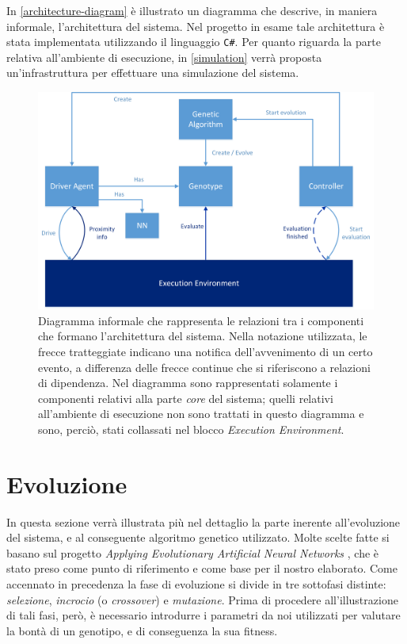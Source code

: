 \documentclass[a4paper,12pt]{article}
\begin{document}
In \autoref{architecture-diagram} è illustrato un diagramma che descrive, in maniera informale, l'architettura del sistema. Nel progetto in esame tale architettura è stata implementata utilizzando il linguaggio \texttt{C\#}. Per quanto riguarda la parte relativa all'ambiente di esecuzione, in \autoref{simulation} verrà proposta un'infrastruttura per effettuare una simulazione del sistema.

\begin{figure}[H]
	\centering
	\includegraphics[width=130mm]{./img/architecture.png}
	\caption{Diagramma informale che rappresenta le relazioni tra i componenti che formano l'architettura del sistema. Nella notazione utilizzata, le frecce tratteggiate indicano una notifica dell'avvenimento di un certo evento, a differenza delle frecce continue che si riferiscono a relazioni di dipendenza. Nel diagramma sono rappresentati solamente i componenti relativi alla parte \emph{core} del sistema; quelli relativi all'ambiente di esecuzione non sono trattati in questo diagramma e sono, perciò, stati collassati nel blocco \emph{Execution Environment}.  \label{architecture-diagram}}
\end{figure}

\section{Evoluzione} \label{evolution}
In questa sezione verrà illustrata più nel dettaglio la parte inerente all'evoluzione del sistema, e al conseguente algoritmo genetico utilizzato. Molte scelte fatte si basano sul progetto \emph{Applying Evolutionary Artificial Neural Networks} \cite{arztRepo}, che è stato preso come punto di riferimento e come base per il nostro elaborato. Come accennato in precedenza la fase di evoluzione si divide in tre sottofasi distinte: \emph{selezione}, \emph{incrocio} (o \emph{crossover}) e \emph{mutazione}. Prima di procedere all'illustrazione di tali fasi, però, è necessario introdurre i parametri da noi utilizzati per valutare la bontà di un genotipo, e di conseguenza la sua fitness.
\end{document}
